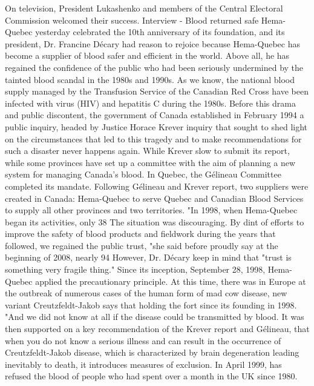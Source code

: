 On television, President Lukashenko and members of the Central Electoral Commission welcomed their success.
Interview - Blood returned safe
Hema-Quebec yesterday celebrated the 10th anniversary of its foundation, and its president, Dr. Francine Décary had reason to rejoice because Hema-Quebec has become a supplier of blood safer and efficient in the world.
Above all, he has regained the confidence of the public who had been seriously undermined by the tainted blood scandal in the 1980s and 1990s.
As we know, the national blood supply managed by the Transfusion Service of the Canadian Red Cross have been infected with virus (HIV) and hepatitis C during the 1980s.
Before this drama and public discontent, the government of Canada established in February 1994 a public inquiry, headed by Justice Horace Krever inquiry that sought to shed light on the circumstances that led to this tragedy and to make recommendations for such a disaster never happens again.
While Krever slow to submit its report, while some provinces have set up a committee with the aim of planning a new system for managing Canada's blood.
In Quebec, the Gélineau Committee completed its mandate.
Following Gélineau and Krever report, two suppliers were created in Canada: Hema-Quebec to serve Quebec and Canadian Blood Services to supply all other provinces and two territories.
"In 1998, when Hema-Quebec began its activities, only 38%
The situation was discouraging.
By dint of efforts to improve the safety of blood products and fieldwork during the years that followed, we regained the public trust, "she said before proudly say at the beginning of 2008, nearly 94%
However, Dr. Décary keep in mind that "trust is something very fragile thing."
Since its inception, September 28, 1998, Hema-Quebec applied the precautionary principle.
At this time, there was in Europe at the outbreak of numerous cases of the human form of mad cow disease, new variant Creutzfeldt-Jakob says that holding the fort since its founding in 1998.
"And we did not know at all if the disease could be transmitted by blood.
It was then supported on a key recommendation of the Krever report and Gélineau, that when you do not know a serious illness and can result in the occurrence of Creutzfeldt-Jakob disease, which is characterized by brain degeneration leading inevitably to death, it introduces measures of exclusion.
In April 1999, has refused the blood of people who had spent over a month in the UK since 1980.
